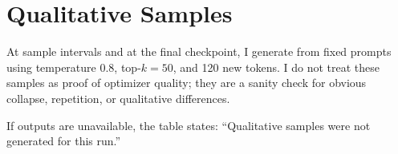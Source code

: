 \section{Qualitative Samples}

At sample intervals and at the final checkpoint, I generate from fixed prompts using temperature \(0.8\), top-\(k=50\), and 120 new tokens. I do not treat these samples as proof of optimizer quality; they are a sanity check for obvious collapse, repetition, or qualitative differences.


If outputs are unavailable, the table states: ``Qualitative samples were not generated for this run.''
